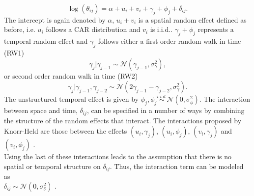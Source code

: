 \begin{equation}
    \log\left(\theta_{ij}\right)=\alpha+u_i+v_i+\gamma_j+\phi_j+\delta_{ij}.
\end{equation}
The intercept is again denoted by $\alpha$, $u_i + v_i$ is a spatial random effect defined as before, i.e. $u_i$ follows a CAR distribution and $v_i$ is i.i.d.. $\gamma_j+\phi_j$ represents a temporal random effect and $\gamma_j$ follows either a first order random walk in time (RW1)
\begin{equation}
    \gamma_j|\gamma_{j-1}\sim\mathcal{N}\left(\gamma_{j-1},\sigma_\gamma^2\right),
\end{equation}
or second order random walk in time (RW2)
\begin{equation}
    \gamma_j|\gamma_{j-1},\gamma_{j-2}\sim\mathcal{N}\left(2\gamma_{j-1}-\gamma_{j-2},\sigma_\gamma^2\right).
\end{equation}
The unstructured temporal effect is given by $\phi_j, \phi_j\overset{i.i.d.}{\sim}\mathcal{N}\left(0, \sigma_\phi^2\right)$. The interaction between space and time, $\delta_{ij}$, can be specified in a number of ways by combining the structure of the random effects that interact. The interactions proposed by Knorr-Held are those between the effects $\left(u_i,\gamma_j\right)$, $\left(u_i,\phi_j\right)$, $\left(v_i,\gamma_j\right)$ and $\left(v_i,\phi_j\right)$ \autocite[][]{knorr2000bayesian}. \\
Using the last of these interactions leads to the assumption that there is no spatial or temporal structure on $\delta_{ij}$. Thus, the interaction term can be modeled as \\ $\delta_{ij}\sim\mathcal{N}\left(0,\sigma_\delta^2\right)$ \autocite[][]{moraga2019geospatial}.
